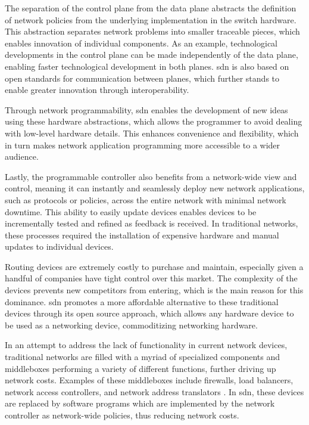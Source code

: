 The separation of the control plane from the data plane abstracts the definition of network policies from the underlying implementation in the switch hardware. This abstraction separates network problems into smaller traceable pieces, which enables innovation of individual components\cite{kreutz_software-defined_2015}. As an example, technological developments in the control plane can be made independently of the data plane, enabling faster technological development in both planes\cite{thyagaturu_software_2016}. \gls{sdn} is also based on open standards for communication between planes, which further stands to enable greater innovation through interoperability.

Through network programmability, \gls{sdn} enables the development of new ideas using these hardware abstractions, which allows the programmer to avoid dealing with low-level hardware details. This enhances convenience and flexibility, which in turn makes network application programming more accessible to a wider audience.

Lastly, the programmable controller also benefits from a network-wide view and control, meaning it can instantly and seamlessly deploy new network applications, such as protocols or policies, across the entire network with minimal network downtime. This ability to easily update devices enables devices to be incrementally tested and refined as feedback is received. In traditional networks, these processes required the installation of expensive hardware and manual updates to individual devices. \cite{xia_survey_2015}

Routing devices are extremely costly to purchase and maintain, especially given a handful of companies have tight control over this market. The complexity of the devices prevents new competitors from entering, which is the main reason for this dominance. \gls{sdn} promotes a more affordable alternative to these traditional devices through its open source approach, which allows any hardware device to be used as a networking device, commoditizing networking hardware. \cite{nunes_survey_2014}

In an attempt to address the lack of functionality in current network devices, traditional networks are filled with a myriad of specialized components and middleboxes performing a variety of different functions\cite{feamster_road_2013}\cite{kreutz_software-defined_2015}, further driving up network costs. Examples of these middleboxes include firewalls, load balancers, network access controllers, and network address translators \cite{nunes_survey_2014}. In \gls{sdn}, these devices are replaced by software programs which are implemented by the network controller as network-wide policies, thus reducing network costs.

